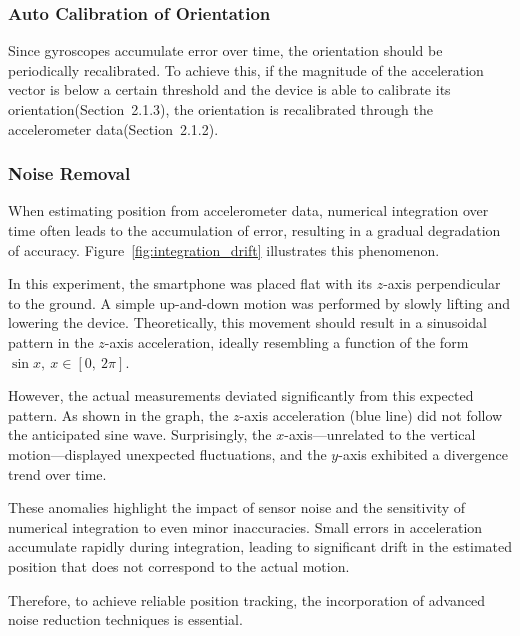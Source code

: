 \documentclass{article}
\begin{document}
\FloatBarrier
\subsubsection{Auto Calibration of Orientation}
Since gyroscopes accumulate error over time, the orientation should be periodically recalibrated.
To achieve this, if the magnitude of the acceleration vector is below a certain threshold and the device is able to calibrate its orientation(Section~2.1.3), the orientation is recalibrated through the accelerometer data(Section~2.1.2).


\FloatBarrier
\subsubsection{Noise Removal}
When estimating position from accelerometer data, numerical integration over time often leads to the accumulation of error, resulting in a gradual degradation of accuracy. Figure~\ref{fig:integration_drift} illustrates this phenomenon.

In this experiment, the smartphone was placed flat with its $z$-axis perpendicular to the ground. A simple up-and-down motion was performed by slowly lifting and lowering the device. Theoretically, this movement should result in a sinusoidal pattern in the $z$-axis acceleration, ideally resembling a function of the form $\sin x,\ x \in [0,\ 2\pi]$.

However, the actual measurements deviated significantly from this expected pattern. As shown in the graph, the $z$-axis acceleration (blue line) did not follow the anticipated sine wave. Surprisingly, the $x$-axis—unrelated to the vertical motion—displayed unexpected fluctuations, and the $y$-axis exhibited a divergence trend over time.

These anomalies highlight the impact of sensor noise and the sensitivity of numerical integration to even minor inaccuracies. Small errors in acceleration accumulate rapidly during integration, leading to significant drift in the estimated position that does not correspond to the actual motion.

Therefore, to achieve reliable position tracking, the incorporation of advanced noise reduction techniques is essential.
\end{document}
